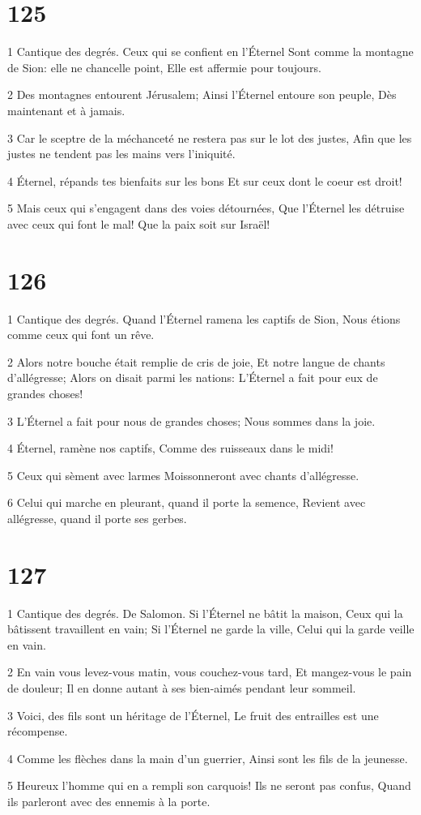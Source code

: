 \chapter{125}

\par 1 Cantique des degrés. Ceux qui se confient en l'Éternel Sont comme la montagne de Sion: elle ne chancelle point, Elle est affermie pour toujours.
\par 2 Des montagnes entourent Jérusalem; Ainsi l'Éternel entoure son peuple, Dès maintenant et à jamais.
\par 3 Car le sceptre de la méchanceté ne restera pas sur le lot des justes, Afin que les justes ne tendent pas les mains vers l'iniquité.
\par 4 Éternel, répands tes bienfaits sur les bons Et sur ceux dont le coeur est droit!
\par 5 Mais ceux qui s'engagent dans des voies détournées, Que l'Éternel les détruise avec ceux qui font le mal! Que la paix soit sur Israël!

\chapter{126}

\par 1 Cantique des degrés. Quand l'Éternel ramena les captifs de Sion, Nous étions comme ceux qui font un rêve.
\par 2 Alors notre bouche était remplie de cris de joie, Et notre langue de chants d'allégresse; Alors on disait parmi les nations: L'Éternel a fait pour eux de grandes choses!
\par 3 L'Éternel a fait pour nous de grandes choses; Nous sommes dans la joie.
\par 4 Éternel, ramène nos captifs, Comme des ruisseaux dans le midi!
\par 5 Ceux qui sèment avec larmes Moissonneront avec chants d'allégresse.
\par 6 Celui qui marche en pleurant, quand il porte la semence, Revient avec allégresse, quand il porte ses gerbes.

\chapter{127}

\par 1 Cantique des degrés. De Salomon. Si l'Éternel ne bâtit la maison, Ceux qui la bâtissent travaillent en vain; Si l'Éternel ne garde la ville, Celui qui la garde veille en vain.
\par 2 En vain vous levez-vous matin, vous couchez-vous tard, Et mangez-vous le pain de douleur; Il en donne autant à ses bien-aimés pendant leur sommeil.
\par 3 Voici, des fils sont un héritage de l'Éternel, Le fruit des entrailles est une récompense.
\par 4 Comme les flèches dans la main d'un guerrier, Ainsi sont les fils de la jeunesse.
\par 5 Heureux l'homme qui en a rempli son carquois! Ils ne seront pas confus, Quand ils parleront avec des ennemis à la porte.

